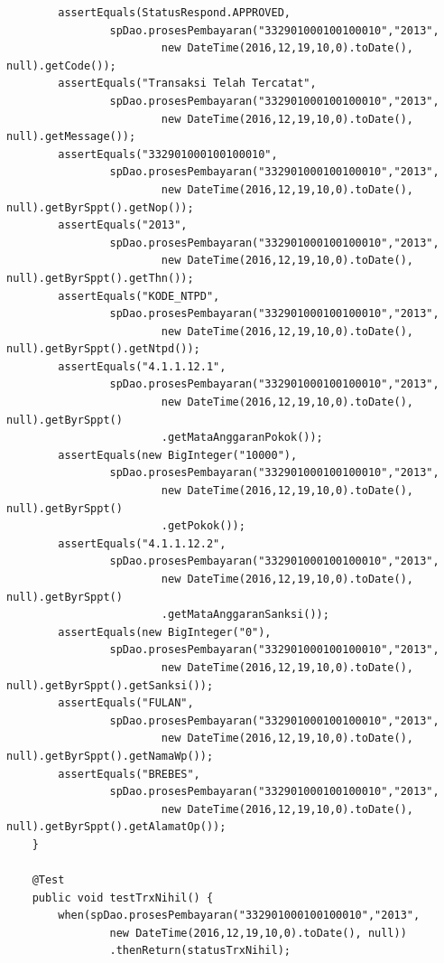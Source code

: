 \documentclass[pdftex,12pt, oneside]{article}
\begin{document}
\begin{enumerate}[A.]
\begin{enumerate}[1.]
\begin{lstlisting}
        assertEquals(StatusRespond.APPROVED,
                spDao.prosesPembayaran("332901000100100010","2013",
                        new DateTime(2016,12,19,10,0).toDate(), null).getCode());
        assertEquals("Transaksi Telah Tercatat",
                spDao.prosesPembayaran("332901000100100010","2013",
                        new DateTime(2016,12,19,10,0).toDate(), null).getMessage());
        assertEquals("332901000100100010",
                spDao.prosesPembayaran("332901000100100010","2013",
                        new DateTime(2016,12,19,10,0).toDate(), null).getByrSppt().getNop());
        assertEquals("2013",
                spDao.prosesPembayaran("332901000100100010","2013",
                        new DateTime(2016,12,19,10,0).toDate(), null).getByrSppt().getThn());
        assertEquals("KODE_NTPD",
                spDao.prosesPembayaran("332901000100100010","2013",
                        new DateTime(2016,12,19,10,0).toDate(), null).getByrSppt().getNtpd());
        assertEquals("4.1.1.12.1",
                spDao.prosesPembayaran("332901000100100010","2013",
                        new DateTime(2016,12,19,10,0).toDate(), null).getByrSppt()
                        .getMataAnggaranPokok());
        assertEquals(new BigInteger("10000"),
                spDao.prosesPembayaran("332901000100100010","2013",
                        new DateTime(2016,12,19,10,0).toDate(), null).getByrSppt()
                        .getPokok());
        assertEquals("4.1.1.12.2",
                spDao.prosesPembayaran("332901000100100010","2013",
                        new DateTime(2016,12,19,10,0).toDate(), null).getByrSppt()
                        .getMataAnggaranSanksi());
        assertEquals(new BigInteger("0"),
                spDao.prosesPembayaran("332901000100100010","2013",
                        new DateTime(2016,12,19,10,0).toDate(), null).getByrSppt().getSanksi());
        assertEquals("FULAN",
                spDao.prosesPembayaran("332901000100100010","2013",
                        new DateTime(2016,12,19,10,0).toDate(), null).getByrSppt().getNamaWp());
        assertEquals("BREBES",
                spDao.prosesPembayaran("332901000100100010","2013",
                        new DateTime(2016,12,19,10,0).toDate(), null).getByrSppt().getAlamatOp());
    }

    @Test
    public void testTrxNihil() {
        when(spDao.prosesPembayaran("332901000100100010","2013",
                new DateTime(2016,12,19,10,0).toDate(), null))
                .thenReturn(statusTrxNihil);


\end{lstlisting}
\end{enumerate}
\end{enumerate}
\end{document}
